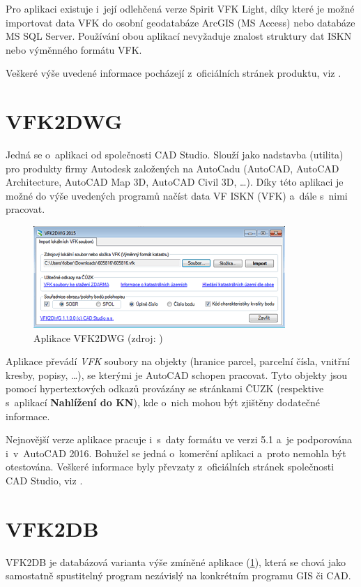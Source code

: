 \documentclass[a4paper,12pt,oneside]{book}
\begin{document}
Pro aplikaci existuje i~její odlehčená verze Spirit VFK Light, díky
které je možné importovat data VFK do osobní geodatabáze ArcGIS (MS
Access) nebo databáze MS SQL Server. Používání obou aplikací
nevyžaduje znalost struktury dat ISKN nebo výměnného formátu VFK.

Veškeré výše uvedené informace pocházejí z~oficiálních stránek
produktu, viz \cite{spirit_vfk}.

\section{VFK2DWG}
\label{l_vfk2dwg}
Jedná se o~aplikaci od společnosti CAD Studio. Slouží jako nadstavba
(utilita) pro produkty firmy Autodesk založených na AutoCadu (AutoCAD,
AutoCAD Architecture, AutoCAD Map 3D, AutoCAD Civil 3D, \dots). Díky
této aplikaci je možné do výše uvedených programů načíst data VF ISKN
(VFK) a~dále s~nimi pracovat.

\begin{figure}[htb]
\centering
\includegraphics[scale=0.85]{images/vfk2dwg-aplikace.png}
\caption[Aplikace VFK2DWG]{Aplikace VFK2DWG (zdroj: \cite{cadstudio-vfk2dwg})}
\end{figure}

Aplikace převádí \textit{VFK} soubory na objekty (hranice parcel,
parcelní čísla, vnitřní kresby, popisy, \dots), se kterými je AutoCAD
schopen pracovat. Tyto objekty jsou pomocí hypertextových odkazů
provázány se stránkami ČUZK (respektive s~aplikací \textbf{Nahlížení
 do KN}), kde o~nich mohou být zjištěny dodatečné informace.

Nejnovější verze aplikace pracuje i~s~daty formátu ve verzi 5.1 a~je
podporována i~v~AutoCAD 2016. Bohužel se jedná o~komerční aplikaci
a~proto nemohla být otestována. Veškeré informace byly převzaty
z~oficiálních stránek společnosti CAD Studio, viz
\cite{cadstudio-vfk2dwg}.


\section{VFK2DB}
VFK2DB je databázová varianta výše zmíněné aplikace (\ref{l_vfk2dwg}),
která se chová jako samostatně spustitelný program nezávislý na
konkrétním programu GIS či CAD.
\end{document}
